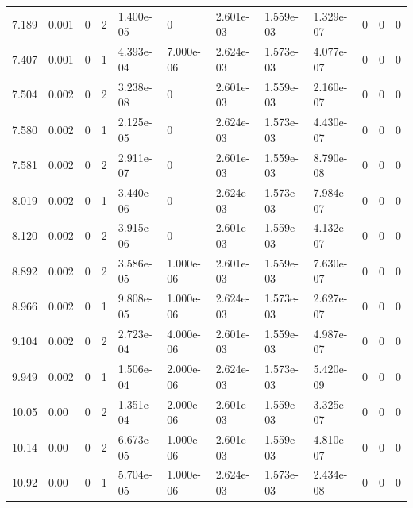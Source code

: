 \documentclass[preview]{standalone}
\begin{document}
{{\begin{tabular}{L{1.2cm}C{1.2cm} C{0.3cm}C{0.5cm} C{1.4cm}C{1.4cm} C{1.4cm}C{1.4cm} C{1.6cm}C{1.6cm} C{1.6cm}C{1.6cm}}
  7.189  &  0.001  & 0     &  2 &  1.400e-05  & 0  &  2.601e-03&   1.559e-03& 1.329e-07 & 0   &  0 & 0  \\ 
  7.407  &  0.001  & 0     &  1 &  4.393e-04  & 7.000e-06  &  2.624e-03&   1.573e-03& 4.077e-07 & 0   &  0 & 0  \\ 
  7.504  &  0.002  & 0     &  2 &  3.238e-08  & 0  &  2.601e-03&   1.559e-03& 2.160e-07 & 0   &  0 & 0  \\ 
  7.580  &  0.002  & 0     &  1 &  2.125e-05  & 0  &  2.624e-03&   1.573e-03& 4.430e-07 & 0   &  0 & 0  \\ 
  7.581  &  0.002  & 0     &  2 &  2.911e-07  & 0  &  2.601e-03&   1.559e-03& 8.790e-08 & 0   &  0 & 0  \\ 
  8.019  &  0.002  & 0     &  1 &  3.440e-06  & 0  &  2.624e-03&   1.573e-03& 7.984e-07 & 0   &  0 & 0  \\ 
  8.120  &  0.002  & 0     &  2 &  3.915e-06  & 0  &  2.601e-03&   1.559e-03& 4.132e-07 & 0   &  0 & 0  \\ 
  8.892  &  0.002  & 0     &  2 &  3.586e-05  & 1.000e-06  &  2.601e-03&   1.559e-03& 7.630e-07 & 0   &  0 & 0  \\ 
  8.966  &  0.002  & 0     &  1 &  9.808e-05  & 1.000e-06  &  2.624e-03&   1.573e-03& 2.627e-07 & 0   &  0 & 0  \\ 
  9.104  &  0.002  & 0     &  2 &  2.723e-04  & 4.000e-06  &  2.601e-03&   1.559e-03& 4.987e-07 & 0   &  0 & 0  \\ 
  9.949  &  0.002  & 0     &  1 &  1.506e-04  & 2.000e-06  &  2.624e-03&   1.573e-03& 5.420e-09 & 0   &  0 & 0  \\ 
  10.05  &  0.00  & 0     &  2 &  1.351e-04  & 2.000e-06  &  2.601e-03&   1.559e-03& 3.325e-07 & 0   &  0 & 0  \\ 
  10.14  &  0.00  & 0     &  2 &  6.673e-05  & 1.000e-06  &  2.601e-03&   1.559e-03& 4.810e-07 & 0   &  0 & 0  \\ 
  10.92  &  0.00  & 0     &  1 &  5.704e-05  & 1.000e-06  &  2.624e-03&   1.573e-03& 2.434e-08 & 0   &  0 & 0  \\ 
\hline 
\end{tabular} 

}}
\end{document}
